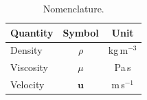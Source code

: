 \documentclass[11pt]{article}
\begin{document}
\begin{table}[h]
  \centering
  \begin{tabular}{lcc}
    \toprule
    Quantity  & Symbol & Unit \\
    \midrule
    Density   & $\rho$ & kg\,m$^{-3}$ \\
    Viscosity & $\mu$  & Pa\,s \\
    Velocity  & $\mathbf{u}$ & m\,s$^{-1}$ \\
    \bottomrule
  \end{tabular}
  \caption{Nomenclature.}
\end{table}
\end{document}
